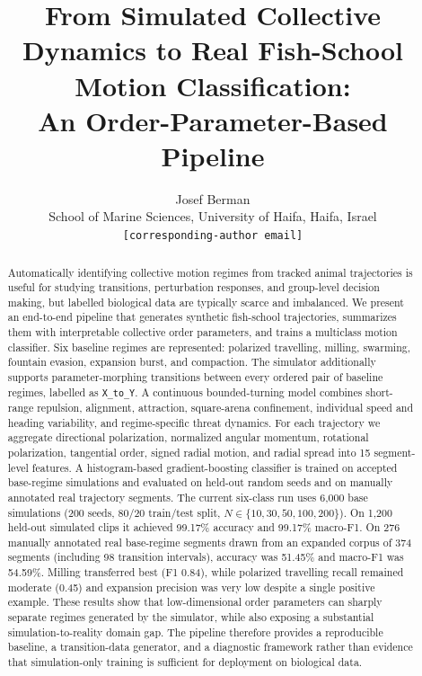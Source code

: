 \documentclass[11pt]{article}
\title{\textbf{From Simulated Collective Dynamics to Real Fish-School Motion Classification:}\\
An Order-Parameter-Based Pipeline}
\author{
  Josef Berman\\
  School of Marine Sciences, University of Haifa, Haifa, Israel\\
  \texttt{[corresponding-author email]}
}
\date{}
\begin{document}
\maketitle

\begin{abstract}
Automatically identifying collective motion regimes from tracked animal trajectories is useful for
studying transitions, perturbation responses, and group-level decision making, but labelled biological
data are typically scarce and imbalanced. We present an end-to-end pipeline that generates synthetic
fish-school trajectories, summarizes them with interpretable collective order parameters, and trains a
multiclass motion classifier. Six baseline regimes are represented: polarized travelling, milling,
swarming, fountain evasion, expansion burst, and compaction. The simulator additionally supports
parameter-morphing transitions between every ordered pair of baseline regimes, labelled as
\texttt{X\_to\_Y}. A continuous bounded-turning model combines short-range repulsion, alignment,
attraction, square-arena confinement, individual speed and heading variability, and regime-specific
threat dynamics. For each trajectory we aggregate directional polarization, normalized angular momentum,
rotational polarization, tangential order, signed radial motion, and radial spread into 15 segment-level
features. A histogram-based gradient-boosting classifier is trained on accepted base-regime simulations
and evaluated on held-out random seeds and on manually annotated real trajectory segments. The current
six-class run uses 6{,}000 base simulations (200 seeds, 80/20 train/test split,
\(N\in\{10,30,50,100,200\}\)). On 1{,}200 held-out simulated clips it achieved 99.17\% accuracy and
99.17\% macro-F1. On 276 manually annotated real base-regime segments drawn from an expanded corpus of
374 segments (including 98 transition intervals), accuracy was 51.45\% and macro-F1 was 54.59\%.
Milling transferred best (F1 0.84), while polarized travelling recall remained moderate (0.45) and
expansion precision was very low despite a single positive example. These results show that
low-dimensional order parameters can sharply separate regimes generated by the simulator, while also
exposing a substantial simulation-to-reality domain gap. The pipeline therefore provides a reproducible
baseline, a transition-data generator, and a diagnostic framework rather than evidence that
simulation-only training is sufficient for deployment on biological data.
\end{abstract}
\end{document}
